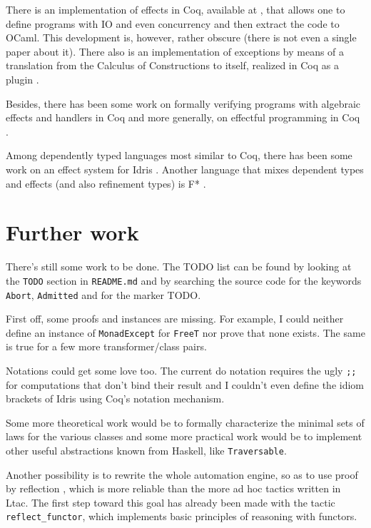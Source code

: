 \documentclass[declaration,inz,english,shortabstract]{iithesis}
\newcommand{\m}[1]{\texttt{#1}}
\begin{document}
There is an implementation of effects in Coq, available at \cite{CoqIO}, that allows one to define programs with IO and even concurrency and then extract the code to OCaml. This development is, however, rather obscure (there is not even a single paper about it). There also is an implementation of exceptions by means of a translation from the Calculus of Constructions to itself, realized in Coq as a plugin \cite{FailureIsNotAnOption}.

Besides, there has been some work on formally verifying programs with algebraic effects and handlers in Coq \cite{CoqEff1} \cite{CoqEff2} and more generally, on effectful programming in Coq \cite{CoqEff3}.

Among dependently typed languages most similar to Coq, there has been some work on an effect system for Idris \cite{IdrisEffects}. Another language that mixes dependent types and effects (and also refinement types) is F* \cite{FStar}.

\section{Further work}

There's still some work to be done. The TODO list can be found by looking at the \m{TODO} section in \m{README.md} and by searching the source code for the keywords \m{Abort}, \m{Admitted} and for the marker TODO.

First off, some proofs and instances are missing. For example, I could neither define an instance of \m{MonadExcept} for \m{FreeT} nor prove that none exists. The same is true for a few more transformer/class pairs.

Notations could get some love too. The current do notation requires the ugly \m{;;} for computations that don't bind their result and I couldn't even define the idiom brackets of Idris using Coq's notation mechanism.

Some more theoretical work would be to formally characterize the minimal sets of laws for the various classes and some more practical work would be to implement other useful abstractions known from Haskell, like \m{Traversable}.

Another possibility is to rewrite the whole automation engine, so as to use proof by reflection \cite{CPDT}, which is more reliable than the more ad hoc tactics written in Ltac. The first step toward this goal has already been made with the tactic \m{reflect\_functor}, which implements basic principles of reasoning with functors.
\end{document}
